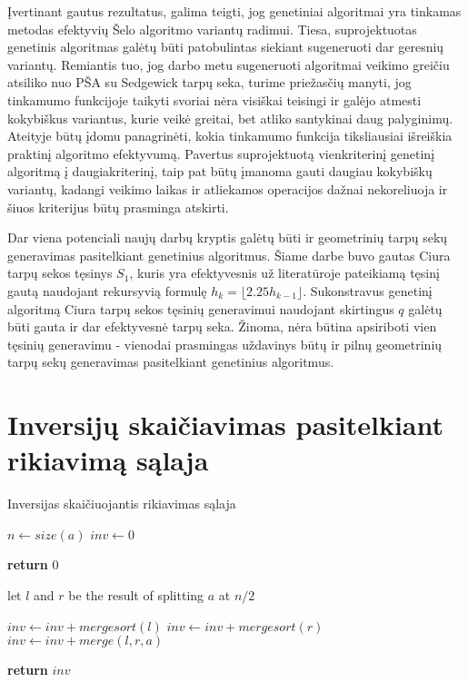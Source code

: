 \documentclass{VUMIFInfKursinis}
\begin{document}
Įvertinant gautus rezultatus, galima teigti, jog genetiniai algoritmai yra tinkamas metodas efektyvių Šelo algoritmo variantų radimui.
Tiesa, suprojektuotas genetinis algoritmas galėtų būti patobulintas siekiant sugeneruoti dar geresnių variantų.
Remiantis tuo, jog darbo metu sugeneruoti algoritmai veikimo greičiu atsiliko nuo PŠA su Sedgewick tarpų seka,
turime priežasčių manyti, jog tinkamumo funkcijoje taikyti svoriai nėra visiškai teisingi ir galėjo atmesti kokybiškus variantus, kurie veikė greitai, bet atliko santykinai daug palyginimų.
Ateityje būtų įdomu panagrinėti, kokia tinkamumo funkcija tiksliausiai išreiškia praktinį algoritmo efektyvumą.
Pavertus suprojektuotą vienkriterinį genetinį algoritmą į daugiakriterinį, taip pat būtų įmanoma gauti daugiau kokybiškų variantų,
kadangi veikimo laikas ir atliekamos operacijos dažnai nekoreliuoja ir šiuos kriterijus būtų prasminga atskirti.

Dar viena potenciali naujų darbų kryptis galėtų būti ir geometrinių tarpų sekų generavimas pasitelkiant genetinius algoritmus.
Šiame darbe buvo gautas Ciura tarpų sekos tęsinys $S_1$, kuris yra efektyvesnis už literatūroje pateikiamą tęsinį gautą naudojant rekursyvią formulę $h_{k}=\lfloor 2.25h_{k-1}\rfloor$.
Sukonstravus genetinį algoritmą Ciura tarpų sekos tęsinių generavimui naudojant skirtingus $q$ galėtų būti gauta ir dar efektyvesnė tarpų seka.
Žinoma, nėra būtina apsiriboti vien tęsinių generavimu - vienodai prasmingas uždavinys būtų ir pilnų geometrinių tarpų sekų generavimas pasitelkiant genetinius algoritmus.



\printbibliography[heading=bibintoc] %

\appendix  %

\section{Inversijų skaičiavimas pasitelkiant rikiavimą sąlaja}

\begin{algorithm}[H]
  \caption{Inversijas skaičiuojantis rikiavimas sąlaja}\label{alg:merge_sort}
  \begin{algorithmic}[1]
      \State $n \gets size(a)$
      \State $inv \gets 0$
      
        \State \textbf{return} $0$ 
      \EndIf

      \State let $l$ and $r$ be the result of splitting $a$ at $n/2$

      \State $inv \gets inv + mergesort(l)$
      \State $inv \gets inv + mergesort(r)$
      \State $inv \gets inv + merge(l,r,a)$

      \State \textbf{return} $inv$ 

    \EndProcedure
  \end{algorithmic}
\end{algorithm}
\end{document}
